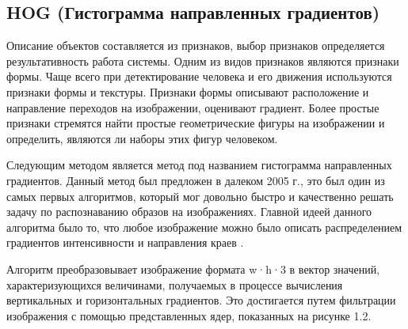 




\subsection{HOG (Гистограмма направленных градиентов)}\label{hog}


Описание объектов составляется из признаков, выбор признаков определяется результативность работа системы. Одним из видов признаков являются признаки формы. Чаще всего при детектирование человека и его движения используются признаки формы и текстуры. Признаки формы описывают расположение и направление переходов на изображении, оценивают градиент. Более простые признаки стремятся найти простые геометрические фигуры на изображении и определить, являются ли наборы этих фигур человеком.

Следующим методом является метод под названием гистограмма направленных градиентов. Данный метод был предложен в далеком 2005 г., это был
один из самых первых алгоритмов, который мог довольно быстро и качественно решать задачу по распознаванию образов на изображениях. Главной идеей
данного алгоритма было то, что любое изображение можно было описать распределением градиентов интенсивности и направления \newline краев \cite{hog1}. 

Алгоритм преобразовывает изображение формата w·h·3 в вектор значений, характеризующихся величинами, получаемых в процессе вычисления вертикальных и горизонтальных градиентов.
Это достигается путем фильтрации изображения с помощью представленных
ядер, показанных на \newline рисунке 1.2.

